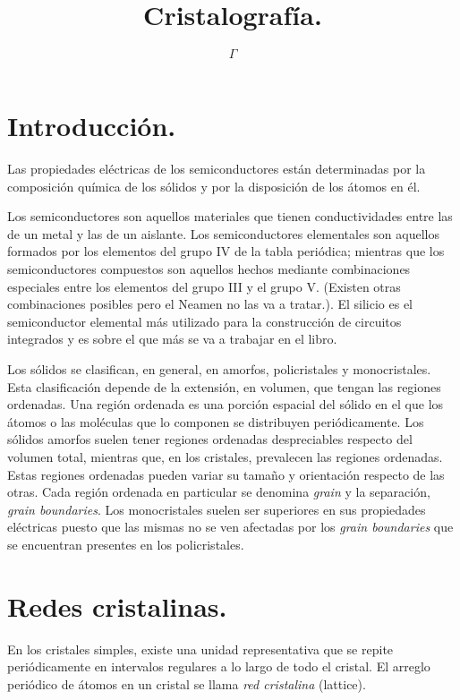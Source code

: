 \documentclass[12pt]{article}
\begin{document}
\title{Cristalografía.}

\author{$\Gamma$}

\maketitle

\section{Introducción.}

Las propiedades eléctricas de los semiconductores están determinadas por la composición química de los sólidos y por la disposición de los átomos en él.

Los semiconductores son aquellos materiales que tienen conductividades entre las de un metal y las de un aislante. Los semiconductores elementales son aquellos formados por los elementos del grupo IV de la tabla periódica; mientras que los semiconductores compuestos son aquellos hechos mediante combinaciones especiales entre los elementos del grupo III y el grupo V. (Existen otras combinaciones posibles pero el Neamen no las va a tratar.). El silicio es el semiconductor elemental más utilizado para la construcción de circuitos integrados y es sobre el que más se va a trabajar en el libro.

Los sólidos se clasifican, en general, en amorfos, policristales y monocristales. Esta clasificación depende de la extensión, en volumen, que tengan las regiones ordenadas. Una región ordenada es una porción espacial del sólido en el que los átomos o las moléculas que lo componen se distribuyen periódicamente. Los sólidos amorfos suelen tener regiones ordenadas despreciables respecto del volumen total, mientras que, en los cristales, prevalecen las regiones ordenadas. Estas regiones ordenadas pueden variar su tamaño y orientación respecto de las otras. Cada región ordenada en particular se denomina \emph{grain} y la separación, \emph{grain boundaries}. Los monocristales suelen ser superiores en sus propiedades eléctricas puesto que las mismas no se ven afectadas por los \emph{grain boundaries} que se encuentran presentes en los policristales.

\section{Redes cristalinas.}

En los cristales simples, existe una unidad representativa que se repite periódicamente en intervalos regulares a lo largo de todo el cristal. El arreglo periódico de átomos en un cristal se llama \emph{red cristalina} (lattice).
\end{document}
